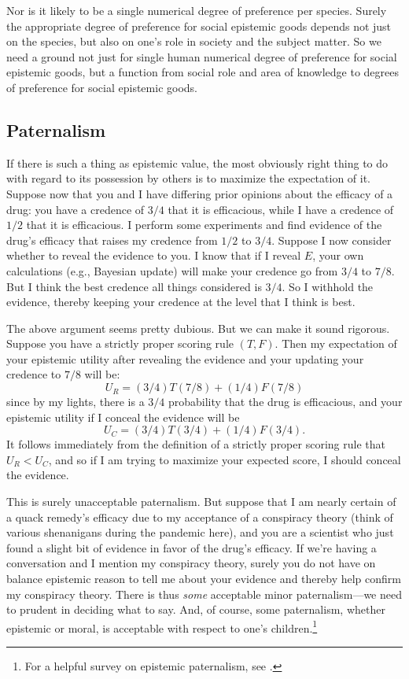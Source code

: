 Nor is it likely to be a single numerical degree of preference per species. Surely the appropriate degree of preference for social epistemic 
goods depends not just on the species, but also on one's role in society and the subject matter. So we need a ground not just for single human numerical degree of
preference for social epistemic goods, but a function from social role and area of knowledge to degrees of preference for
social epistemic goods.

\subsection{Paternalism}
If there is such a thing as epistemic value, the most obviously right thing to do with regard to its possession
by others is to maximize the expectation of it. Suppose now that you and I have differing prior opinions about the efficacy
of a drug: you have a credence of $3/4$ that it is efficacious, while I have a credence of $1/2$ that it is efficacious.
I perform some experiments and find evidence of the drug's efficacy that raises my credence from $1/2$ to $3/4$.
Suppose I now consider whether to reveal the evidence to you. I know that if I reveal $E$, your own calculations
(e.g., Bayesian update) will make your credence go from $3/4$ to $7/8$. But I think the best credence all things considered is $3/4$.
So I withhold the evidence, thereby keeping your credence at the level that I think is best. 

The above argument seems pretty dubious. But we can make it sound rigorous. Suppose you have a strictly proper 
scoring rule $(T,F)$. Then
my expectation of your epistemic utility after revealing the evidence and your updating your credence to $7/8$ will be:
$$
	U_R = (3/4)T(7/8)+(1/4)F(7/8)
$$
since by my lights, there is a $3/4$ probability that the drug is efficacious, and your epistemic utility if I
conceal the evidence will be
$$
	U_C = (3/4)T(3/4)+(1/4)F(3/4).
$$
It follows immediately from the definition of a strictly proper scoring rule that $U_R < U_C$, and so if I am trying
to maximize your expected score, I should conceal the evidence.

This is surely unacceptable paternalism. But suppose that I am nearly certain of a quack remedy's
efficacy due to my acceptance of a conspiracy theory (think of various
shenanigans during the pandemic here), and you are a scientist who just found a slight bit of evidence 
in favor of the drug's efficacy. If we're having a conversation and I mention my conspiracy theory, surely
you do not have on balance epistemic reason to tell me about your evidence and thereby help confirm my conspiracy
theory. There is thus \textit{some} acceptable minor paternalism---we need to prudent in deciding what to say. And, of course, some paternalism, whether epistemic or moral, is acceptable with respect to one's children.\footnote{For
a helpful survey on epistemic paternalism, see .}

